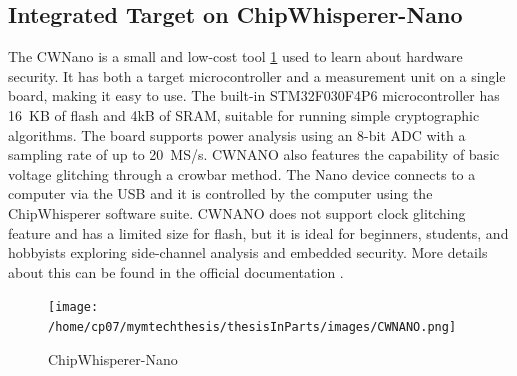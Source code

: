 \subsection{Integrated Target on ChipWhisperer-Nano}
The CWNano is a small and low-cost tool \ref{fig:nano_target} used to learn about hardware security. It has both a target microcontroller and a measurement unit on a single board, making it easy to use. The built-in STM32F030F4P6 microcontroller has 16~KB of flash and 4kB of SRAM, suitable for running simple cryptographic algorithms. The board supports power analysis using an 8-bit ADC with a sampling rate of up to 20~MS/s. CWNANO also features the capability of basic voltage glitching through a crowbar method. The Nano device connects to a computer via the USB and it is controlled by the computer using the ChipWhisperer software suite. CWNANO does not support clock glitching feature and has a limited size for flash, but it is ideal for beginners, students, and hobbyists exploring side-channel analysis and embedded security. More details about this can be found in the official documentation \cite{chipwhisperer_nano}.
\begin{figure}[h]
    \centering
    \texttt{[image: /home/cp07/mymtechthesis/thesisInParts/images/CWNANO.png]}
    \caption{ChipWhisperer-Nano}
    \label{fig:nano_target}
\end{figure}



